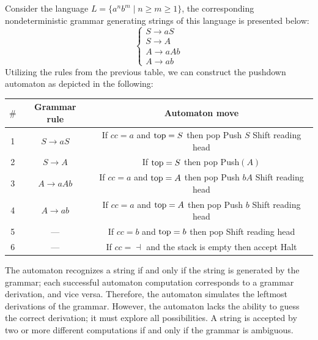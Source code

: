 \begin{example}
    Consider the language $L=\{a^nb^m\mid n \geq m \geq 1\}$, the corresponding nondeterministic grammar generating strings of this language is presented below:
    \[\begin{cases}
        S \rightarrow aS \\
        S \rightarrow A \\
        A \rightarrow aAb \\
        A \rightarrow ab
    \end{cases}\]
    Utilizing the rules from the previous table, we can construct the pushdown automaton as depicted in the following:
    \begin{table}[H]
        \centering
        \begin{tabular}{ccc}
        \hline
        $\#$ & \textbf{Grammar rule}    & \textbf{Automaton move}                                                                                   \\ \hline
        1    & $ S \rightarrow aS$      & \makecell{If $cc=a$ and $\textnormal{top}=S$ then pop \\ Push $S$ \\ Shift reading head}                  \\ 
        2    & $S \rightarrow A$        & \makecell{If $\textnormal{top}=S$ then pop \\ Push$(A)$   }                                               \\ 
        3    & $A \rightarrow aAb$      & \makecell{If $cc=a$ and $\textnormal{top}=A$ then pop \\ Push $bA$ \\ Shift reading head}                 \\ 
        4    & $A \rightarrow ab$       & \makecell{If $cc=a$ and $\textnormal{top}=A$ then pop \\ Push $b$ \\ Shift reading head}                  \\ 
        5    & ---                      & \makecell{If $cc=b$ and $\textnormal{top}=b$ then pop \\ Shift reading head}                              \\ 
        6    & ---                      & \makecell{If $cc=\dashv$ and the stack is empty then accept \\ Halt}                                      \\ \hline
        \end{tabular}
    \end{table}
\end{example}
The automaton recognizes a string if and only if the string is generated by the grammar; each successful automaton computation corresponds to a grammar derivation, and vice versa.
Therefore, the automaton simulates the leftmost derivations of the grammar.
However, the automaton lacks the ability to guess the correct derivation; it must explore all possibilities.
A string is accepted by two or more different computations if and only if the grammar is ambiguous.

